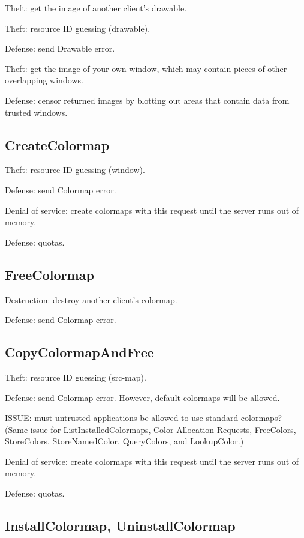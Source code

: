 \documentclass{article}
\begin{document}
Theft: get the image of another client's drawable.

Theft: resource ID guessing (drawable).

Defense: send Drawable error.

Theft: get the image of your own window, which may contain pieces of
other overlapping windows.

Defense: censor returned images by blotting out areas that contain
data from trusted windows.



\subsection{CreateColormap}

Theft: resource ID guessing (window).

Defense: send Colormap error.

Denial of service: create colormaps with this request until the server
runs out of memory.

Defense: quotas.



\subsection{FreeColormap}

Destruction: destroy another client's colormap.

Defense: send Colormap error.



\subsection{CopyColormapAndFree}

Theft: resource ID guessing (src-map).

Defense: send Colormap error.  However, default colormaps will be
allowed.

ISSUE: must untrusted applications be allowed to use standard colormaps?
(Same issue for ListInstalledColormaps, Color Allocation Requests,
FreeColors, StoreColors, StoreNamedColor, QueryColors, and LookupColor.)

Denial of service: create colormaps with this request until the server
runs out of memory.

Defense: quotas.



\subsection{InstallColormap, UninstallColormap}
\end{document}

